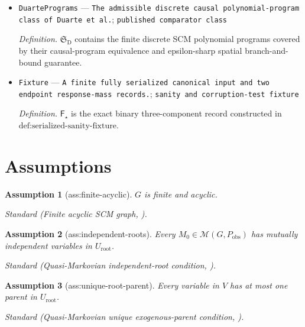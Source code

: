 \documentclass{article}
\newtheorem{assumption}{Assumption}
\begin{document}
\begin{itemize}
  \par\smallskip\noindent\emph{Definition.} \(\mathfrak S_{\mathrm{SI}}\) contains their finite quasi-Markovian canonical multilinear programs, and \(\mathfrak S_{\mathrm{SI}}^{\le2}\) is its at-most-quadratic exact-optimization subfamily.
  \item \texttt{DuartePrograms} --- \texttt{The admissible discrete causal polynomial-\allowbreak{}program class of Duarte et al.}; \texttt{published comparator class}
  \par\smallskip\noindent\emph{Definition.} \(\mathfrak S_{\mathrm{D}}\) contains the finite discrete SCM polynomial programs covered by their causal-program equivalence and epsilon-sharp spatial branch-and-bound guarantee.
  \item \texttt{Fixture} --- \texttt{A finite fully serialized canonical input and two endpoint response-\allowbreak{}mass records.}; \texttt{sanity and corruption-\allowbreak{}test fixture}
  \par\smallskip\noindent\emph{Definition.} \(\mathsf F_\star\) is the exact binary three-component record constructed in \(\text{def:serialized-sanity-fixture}\).
\end{itemize}

\section{Assumptions}

\begin{assumption}[ass:finite-acyclic]\label{ass:finite-acyclic}
\(G\) is finite and acyclic.
\par\smallskip\noindent\emph{Standard} (Finite acyclic SCM graph, \cite{DuarteEtAl2023}).
\end{assumption}

\begin{assumption}[ass:independent-roots]\label{ass:independent-roots}
Every \(M_0\in\mathcal M(G,P_{\mathrm{obs}})\) has mutually independent variables in \(U_{\mathrm{root}}\).
\par\smallskip\noindent\emph{Standard} (Quasi-Markovian independent-root condition, \cite{ZaffalonAntonucciCabanas2020}).
\end{assumption}

\begin{assumption}[ass:unique-root-parent]\label{ass:unique-root-parent}
Every variable in \(V\) has at most one parent in \(U_{\mathrm{root}}\).
\par\smallskip\noindent\emph{Standard} (Quasi-Markovian unique exogenous-parent condition, \cite{ShridharanIyengar2023}).
\end{assumption}
\end{document}

